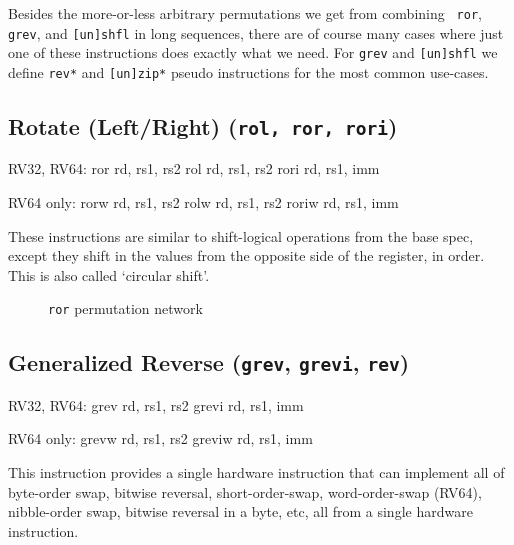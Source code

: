 Besides the more-or-less arbitrary permutations we get from combining {\tt
ror}, {\tt grev}, and {\tt [un]shfl} in long sequences, there are of course
many cases where just one of these instructions does exactly what we need.
For {\tt grev} and {\tt [un]shfl} we define {\tt rev*} and {\tt [un]zip*}
pseudo instructions for the most common use-cases.


\subsection{Rotate (Left/Right) (\texttt{rol,\ ror,\ rori})}

\begin{rvb}
  RV32, RV64:
    ror  rd, rs1, rs2
    rol  rd, rs1, rs2
    rori rd, rs1, imm

  RV64 only:
    rorw  rd, rs1, rs2
    rolw  rd, rs1, rs2
    roriw rd, rs1, imm
\end{rvb}

These instructions are similar to shift-logical operations from the base
spec, except they shift in the values from the opposite side of the
register, in order. This is also called `circular shift'.




\begin{figure}[t]
\begin{center}

\end{center}
\caption{\texttt{ror} permutation network}
\label{permnet-ror}
\end{figure}

\subsection{Generalized Reverse (\texttt{grev}, \texttt{grevi}, \texttt{rev})}
\label{grev}

\begin{rvb}
  RV32, RV64:
    grev  rd, rs1, rs2
    grevi rd, rs1, imm

  RV64 only:
    grevw  rd, rs1, rs2
    greviw rd, rs1, imm
\end{rvb}

This instruction provides a single hardware instruction that can implement all
of byte-order swap, bitwise reversal, short-order-swap, word-order-swap
(RV64), nibble-order swap, bitwise reversal in a byte, etc, all from a single
hardware instruction.

